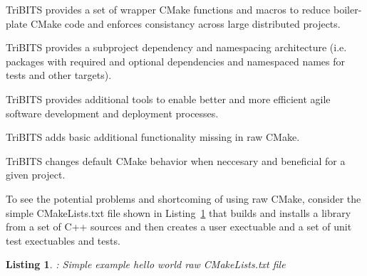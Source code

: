 \documentclass[note]{TechNote}
\newtheorem{listing}{Listing}
\begin{document}
\begin{compactitem}
\item TriBITS provides a set of wrapper CMake functions and macros to reduce boiler-plate CMake code and enforces consistancy across large distributed projects.
\item TriBITS provides a subproject dependency and namespacing architecture (i.e. packages with required and optional dependencies and namespaced names for tests and other targets).
\item TriBITS provides additional tools to enable better and more efficient agile software development and deployment processes.
\item TriBITS adds basic additional functionality missing in raw CMake.
\item TriBITS changes default CMake behavior when neccesary and beneficial for a given project.
\end{compactitem}

To see the potential problems and shortcoming of using raw CMake, consider the simple CMakeLists.txt file shown in Listing~\ref{listing:RawHelloWorld} that builds and installs a library from a set of C++ sources and then creates a user exectuable and a set of unit test exectuables and tests.

\begin{listing}: Simple example hello world raw CMakeLists.txt file
\label{listing:RawHelloWorld}
{\small

}
\end{listing}
\end{document}
